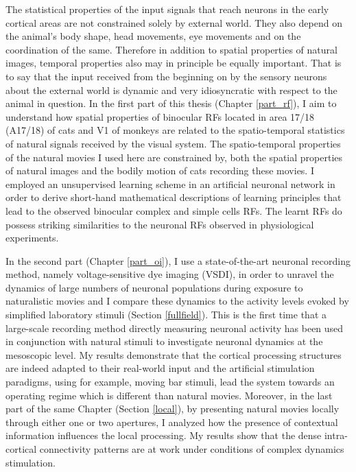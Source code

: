 The statistical properties of the input signals that reach neurons in the
early cortical areas are not constrained solely by external world.  They
also depend on the animal's body shape, head movements, eye movements and
on the coordination of the same. Therefore in addition to spatial
properties of natural images, temporal properties also may in principle be
equally important. That is to say that the input received from the
beginning on by the sensory neurons about the external world is dynamic and
very idiosyncratic with respect to the animal in question. In the first
part of this thesis (Chapter \ref{part_rf}), I aim to understand how
spatial properties of binocular RFs located in area 17/18
(A17/18) of cats and V1 of monkeys are
related to the spatio-temporal statistics of natural signals received by
the visual system. The spatio-temporal properties of the natural movies I
used here are constrained by, both the spatial properties of natural images
and the bodily motion of cats recording these movies. I employed an
unsupervised learning scheme in an artificial neuronal network in order to
derive short-hand mathematical descriptions of learning principles that
lead to the observed binocular complex and simple cells RFs. The learnt RFs
do possess striking similarities to the neuronal RFs observed in
physiological experiments.

In the second part (Chapter \ref{part_oi}), I use a state-of-the-art neuronal
recording method, namely voltage-sensitive dye imaging (VSDI),
 in order to unravel the
dynamics of large numbers of neuronal populations during exposure to
naturalistic movies and I compare these dynamics to the activity levels
evoked by simplified laboratory stimuli (Section \ref{fullfield}). This is
the first time that a large-scale recording method directly measuring
neuronal activity has been used in conjunction with natural stimuli to
investigate neuronal dynamics at the mesoscopic level. My results
demonstrate that the cortical processing structures are indeed adapted to
their real-world input and the artificial stimulation paradigms, using for
example, moving bar stimuli, lead the system towards an operating regime
which is different than natural movies. Moreover, in the last part of the
same Chapter (Section \ref{local}), by presenting natural movies locally
through either one or two apertures, I analyzed how the presence of
contextual information influences the local processing. My results show
that the dense intra-cortical connectivity patterns are at work under
conditions of complex dynamics stimulation.


